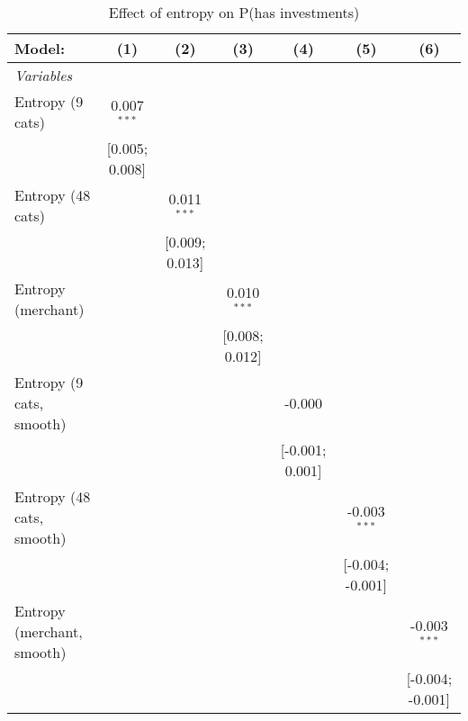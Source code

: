 
\begin{table}[htbp]
   \centering
   \tiny
   \begin{threeparttable}[b]
      \caption{\label{tab:reg_has_investments_main} Effect of entropy on P(has investments)}
      \begin{tabular}{lcccccc}
         \tabularnewline \midrule \midrule
         Model:                     & (1)            & (2)            & (3)            & (4)             & (5)              & (6)\\  
         \midrule
         \emph{Variables}\\
         Entropy (9 cats)           & 0.007$^{***}$  &                &                &                 &                  &   \\   
                                    & [0.005; 0.008] &                &                &                 &                  &   \\   
         Entropy (48 cats)          &                & 0.011$^{***}$  &                &                 &                  &   \\   
                                    &                & [0.009; 0.013] &                &                 &                  &   \\   
         Entropy (merchant)         &                &                & 0.010$^{***}$  &                 &                  &   \\   
                                    &                &                & [0.008; 0.012] &                 &                  &   \\   
         Entropy (9 cats, smooth)   &                &                &                & -0.000          &                  &   \\   
                                    &                &                &                & [-0.001; 0.001] &                  &   \\   
         Entropy (48 cats, smooth)  &                &                &                &                 & -0.003$^{***}$   &   \\   
                                    &                &                &                &                 & [-0.004; -0.001] &   \\   
         Entropy (merchant, smooth) &                &                &                &                 &                  & -0.003$^{***}$\\   
                                    &                &                &                &                 &                  & [-0.004; -0.001]\\   

\end{tabular}
\end{threeparttable}
\end{table}
